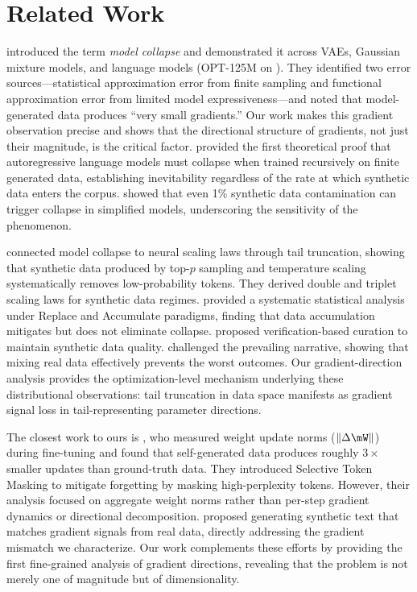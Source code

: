 \section{Related Work}
\label{sec:related}

\citet{shumailov2023curse} introduced the term \emph{model collapse} and demonstrated it across VAEs, Gaussian mixture models, and language models (OPT-125M on \wikitext). They identified two error sources---statistical approximation error from finite sampling and functional approximation error from limited model expressiveness---and noted that model-generated data produces ``very small gradients.'' Our work makes this gradient observation precise and shows that the directional structure of gradients, not just their magnitude, is the critical factor. \citet{wang2024theoretical} provided the first theoretical proof that autoregressive language models must collapse when trained recursively on finite generated data, establishing inevitability regardless of the rate at which synthetic data enters the corpus. \citet{dohmatob2024strong} showed that even 1\% synthetic data contamination can trigger collapse in simplified models, underscoring the sensitivity of the phenomenon.

\citet{dohmatob2024tale} connected model collapse to neural scaling laws through tail truncation, showing that synthetic data produced by top-$p$ sampling and temperature scaling systematically removes low-probability tokens. They derived double and triplet scaling laws for synthetic data regimes. \citet{kazdan2024bad} provided a systematic statistical analysis under Replace and Accumulate paradigms, finding that data accumulation mitigates but does not eliminate collapse. \citet{feng2024synthesize} proposed verification-based curation to maintain synthetic data quality. \citet{seddik2025position} challenged the prevailing narrative, showing that mixing real data effectively prevents the worst outcomes. Our gradient-direction analysis provides the optimization-level mechanism underlying these distributional observations: tail truncation in data space manifests as gradient signal loss in tail-representing parameter directions.

The closest work to ours is \citet{wu2025mitigating}, who measured weight update norms ($\|\Delta \mW\|$) during fine-tuning and found that self-generated data produces roughly $3\times$ smaller updates than ground-truth data. They introduced Selective Token Masking to mitigate forgetting by masking high-perplexity tokens. However, their analysis focused on aggregate weight norms rather than per-step gradient dynamics or directional decomposition. \citet{wang2025synthetic} proposed generating synthetic text that matches gradient signals from real data, directly addressing the gradient mismatch we characterize. Our work complements these efforts by providing the first fine-grained analysis of gradient directions, revealing that the problem is not merely one of magnitude but of dimensionality.

